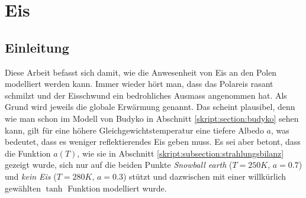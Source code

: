 %
%
%
\chapter{Eis\label{chapter:eis}}
\begin{refsection}

\section{Einleitung}
Diese Arbeit befasst sich damit, wie die Anwesenheit von Eis an den Polen modelliert werden kann. Immer wieder hört man, dass das Polareis rasant schmilzt und der Eisschwund ein bedrohliches Ausmass angenommen hat. Als Grund wird jeweils die globale Erwärmung genannt. Das scheint plausibel, denn wie man schon im Modell von Budyko in Abschnitt \ref{skript:section:budyko} sehen kann, gilt für eine höhere Gleichgewichtstemperatur eine tiefere Albedo $a$, was bedeutet, dass es weniger reflektierendes Eis geben muss. Es sei aber betont, dass die Funktion $a(T)$, wie sie in Abschnitt \ref{skript:subsection:strahlungsbilanz} gezeigt wurde, sich nur auf die beiden Punkte {\em Snowball earth} ($T=250K$, $a=0.7$) und {\em kein Eis} ($T=280K$, $a=0.3$) stützt und dazwischen mit einer willkürlich gewählten $\tanh$ Funktion modelliert wurde. 
%
%
%

\end{refsection}
